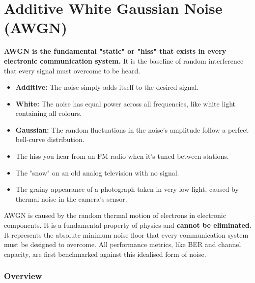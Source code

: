 
\chapter{Additive White Gaussian Noise (AWGN)}
\label{ch:awgn}

\begin{nontechnical}
    \textbf{AWGN is the fundamental "static" or "hiss" that exists in every electronic communication system.} It is the baseline of random interference that every signal must overcome to be heard.

    \begin{itemize}
        \item \textbf{Additive:} The noise simply adds itself to the desired signal.
        \item \textbf{White:} The noise has equal power across all frequencies, like white light containing all colours.
        \item \textbf{Gaussian:} The random fluctuations in the noise's amplitude follow a perfect bell-curve distribution.
    \end{itemize}

    \begin{itemize}
        \item The hiss you hear from an FM radio when it's tuned between stations.
        \item The "snow" on an old analog television with no signal.
        \item The grainy appearance of a photograph taken in very low light, caused by thermal noise in the camera's sensor.
    \end{itemize}

     AWGN is caused by the random thermal motion of electrons in electronic components. It is a fundamental property of physics and \textbf{cannot be eliminated}. It represents the absolute minimum noise floor that every communication system must be designed to overcome. All performance metrics, like BER and channel capacity, are first benchmarked against this idealised form of noise.
\end{nontechnical}


\subsection{Overview}

